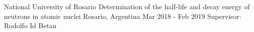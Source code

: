 

\begin{cventries}

  \cventry
    {National University of Rosario} %
    {Determination of the half-life and decay energy of neutrons in atomic nuclei} %
    {Rosario, Argentina} %
    {Mar 2018 - Feb 2019} %
    {Supervisor: Rodolfo Id Betan}


\end{cventries}
